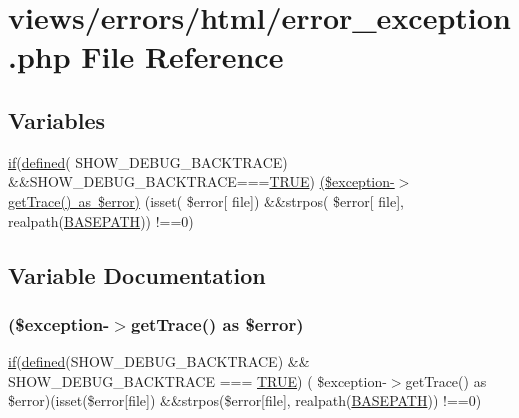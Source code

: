 \hypertarget{html_2error__exception_8php}{}\section{views/errors/html/error\+\_\+exception.php File Reference}
\label{html_2error__exception_8php}
\subsection*{Variables}
\begin{DoxyCompactItemize}
\item 
\mbox{\hyperlink{_test_test_8php_a107bc088eea0dce8972b45c841f5ff9c}{if}}(\mbox{\hyperlink{password_8php_a74f41c0efe4435fb8ac2133464d3cd57}{defined}}( \textquotesingle{}S\+H\+O\+W\+\_\+\+D\+E\+B\+U\+G\+\_\+\+B\+A\+C\+K\+T\+R\+A\+CE\textquotesingle{}) \&\&S\+H\+O\+W\+\_\+\+D\+E\+B\+U\+G\+\_\+\+B\+A\+C\+K\+T\+R\+A\+CE===\mbox{\hyperlink{constants_8php_ae04a3efe6aa42044f803ee90c2277846}{T\+R\+UE}}) \mbox{\hyperlink{html_2error__exception_8php_a4baaf90ce01e99d4aaeb31d010ddc15a}{(\$exception-\/$>$get\+Trace() as \$error)}} (isset( \$error\mbox{[} \textquotesingle{}file\textquotesingle{}\mbox{]}) \&\&strpos( \$error\mbox{[} \textquotesingle{}file\textquotesingle{}\mbox{]}, realpath(\mbox{\hyperlink{index_8php_ad39801cabfd338dc5524466fe793fda9}{B\+A\+S\+E\+P\+A\+TH}})) !==0)
\end{DoxyCompactItemize}


\subsection{Variable Documentation}
\mbox{\label{html_2error__exception_8php_a4baaf90ce01e99d4aaeb31d010ddc15a}} 
\subsubsection{\texorpdfstring{(\$exception-\/$>$get\+Trace() as \$error)}{($exception->getTrace() as $error)}}
{\footnotesize\ttfamily \mbox{\hyperlink{_test_test_8php_a107bc088eea0dce8972b45c841f5ff9c}{if}}(\mbox{\hyperlink{password_8php_a74f41c0efe4435fb8ac2133464d3cd57}{defined}}(\textquotesingle{}S\+H\+O\+W\+\_\+\+D\+E\+B\+U\+G\+\_\+\+B\+A\+C\+K\+T\+R\+A\+CE\textquotesingle{}) \&\& S\+H\+O\+W\+\_\+\+D\+E\+B\+U\+G\+\_\+\+B\+A\+C\+K\+T\+R\+A\+CE === \mbox{\hyperlink{constants_8php_ae04a3efe6aa42044f803ee90c2277846}{T\+R\+UE}}) ( \$exception-\/$>$get\+Trace() as \$error)(isset(\$error\mbox{[}\textquotesingle{}file\textquotesingle{}\mbox{]}) \&\&strpos(\$error\mbox{[}\textquotesingle{}file\textquotesingle{}\mbox{]}, realpath(\mbox{\hyperlink{index_8php_ad39801cabfd338dc5524466fe793fda9}{B\+A\+S\+E\+P\+A\+TH}})) !==0)}

